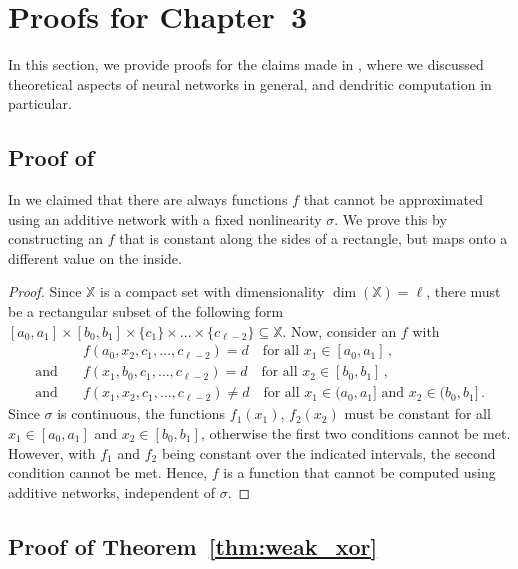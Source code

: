 
\section{Proofs for Chapter~3}
\label{app:neural_network_proofs}

In this section, we provide proofs for the claims made in , where we discussed theoretical aspects of neural networks in general, and dendritic computation in particular.

\subsection{Proof of }

In  we claimed that there are always functions $f$ that cannot be approximated using an additive network with a fixed nonlinearity $\sigma$.
We prove this by constructing an $f$ that is constant along the sides of a rectangle, but maps onto a different value on the inside.

\ThmXorGeneral*

\begin{proof}
Since $\mathbb{X}$ is a compact set with dimensionality $\dim(\mathbb{X}) = \ell$, there must be a rectangular subset of the following form
$[a_0, a_1] \times [b_0, b_1] \times \{c_1\} \times \ldots \times \{c_{\ell - 2}\} \subseteq \mathbb{X}$.
Now, consider an $f$ with
\begin{align*}
				     &f(a_0, x_2, c_1, \ldots, c_{\ell - 2}) = d \quad \text{for all } x_1 \in [a_0, a_1] \,, \\
	\text{and} \quad &f(x_1, b_0, c_1, \ldots, c_{\ell - 2}) = d \quad \text{for all } x_2 \in [b_0, b_1] \,, \\
	\text{and} \quad &f(x_1, x_2, c_1, \ldots, c_{\ell - 2}) \neq d \quad \text{for all } x_1 \in (a_0, a_1] \text{ and } x_2 \in (b_0, b_1] \,.
\end{align*}
Since $\sigma$ is continuous, the functions $f_1(x_1)$, $f_2(x_2)$ must be constant for all $x_1 \in [a_0, a_1]$ and $x_2 \in [b_0, b_1]$, otherwise the first two conditions cannot be met.
However, with $f_1$ and $f_2$ being constant over the indicated intervals, the second condition cannot be met. Hence, $f$ is a function that cannot be computed using additive networks, independent of $\sigma$.
\end{proof}

\subsection{Proof of Theorem~\ref{thm:weak_xor}}
\label{app:thm_weak_xor}

